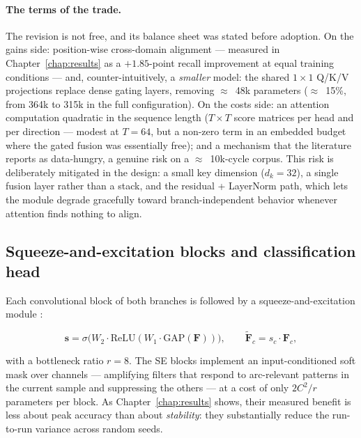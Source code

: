 \paragraph{The terms of the trade.} The revision is not free, and its balance sheet was stated before adoption. On the gains side: position-wise cross-domain alignment --- measured in Chapter~\ref{chap:results} as a $+1.85$-point recall improvement at equal training conditions --- and, counter-intuitively, a \emph{smaller} model: the shared $1 \times 1$ Q/K/V projections replace dense gating layers, removing $\approx$~48k parameters ($\approx$~15\%, from 364k to 315k in the full configuration). On the costs side: an attention computation quadratic in the sequence length ($T \times T$ score matrices per head and per direction --- modest at $T = 64$, but a non-zero term in an embedded budget where the gated fusion was essentially free); and a mechanism that the literature reports as data-hungry, a genuine risk on a $\approx$~10k-cycle corpus. This risk is deliberately mitigated in the design: a small key dimension ($d_k = 32$), a single fusion layer rather than a stack, and the residual + LayerNorm path, which lets the module degrade gracefully toward branch-independent behavior whenever attention finds nothing to align.

\subsection{Squeeze-and-excitation blocks and classification head}

Each convolutional block of both branches is followed by a squeeze-and-excitation module \cite{hu2018squeeze}:

\begin{equation}
\mathbf{s} = \sigma\big(W_2 \cdot \mathrm{ReLU}(W_1 \cdot \mathrm{GAP}(\mathbf{F}))\big), \qquad \tilde{\mathbf{F}}_c = s_c \cdot \mathbf{F}_c,
\label{eq:se}
\end{equation}

with a bottleneck ratio $r = 8$. The SE blocks implement an input-conditioned soft mask over channels --- amplifying filters that respond to arc-relevant patterns in the current sample and suppressing the others --- at a cost of only $2C^2/r$ parameters per block. As Chapter~\ref{chap:results} shows, their measured benefit is less about peak accuracy than about \emph{stability}: they substantially reduce the run-to-run variance across random seeds.

\medskip

